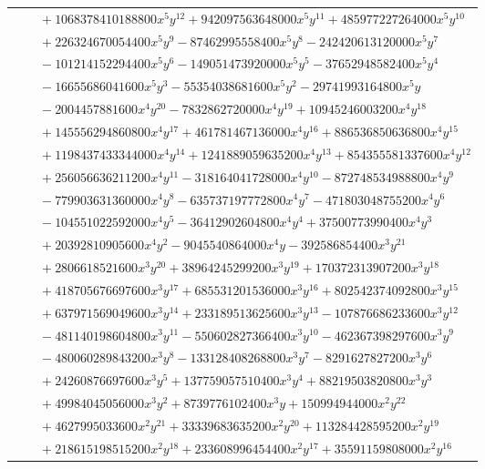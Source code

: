\documentclass[11pt]{article}
\begin{document}
\begin{longtable}{@{}ll@{}}
 & $\quad +1068378410188800x^{5}y^{12}+942097563648000x^{5}y^{11}+485977227264000x^{5}y^{10}$\\
 & $\quad +226324670054400x^{5}y^{9}-87462995558400x^{5}y^{8}-242420613120000x^{5}y^{7}$\\
 & $\quad -101214152294400x^{5}y^{6}-149051473920000x^{5}y^{5}-37652948582400x^{5}y^{4}$\\
 & $\quad -16655686041600x^{5}y^{3}-55354038681600x^{5}y^{2}-29741993164800x^{5}y$\\
 & $\quad -2004457881600x^{4}y^{20}-7832862720000x^{4}y^{19}+10945246003200x^{4}y^{18}$\\
 & $\quad +145556294860800x^{4}y^{17}+461781467136000x^{4}y^{16}+886536850636800x^{4}y^{15}$\\
 & $\quad +1198437433344000x^{4}y^{14}+1241889059635200x^{4}y^{13}+854355581337600x^{4}y^{12}$\\
 & $\quad +256056636211200x^{4}y^{11}-318164041728000x^{4}y^{10}-872748534988800x^{4}y^{9}$\\
 & $\quad -779903631360000x^{4}y^{8}-635737197772800x^{4}y^{7}-471803048755200x^{4}y^{6}$\\
 & $\quad -104551022592000x^{4}y^{5}-36412902604800x^{4}y^{4}+37500773990400x^{4}y^{3}$\\
 & $\quad +20392810905600x^{4}y^{2}-9045540864000x^{4}y-392586854400x^{3}y^{21}$\\
 & $\quad +2806618521600x^{3}y^{20}+38964245299200x^{3}y^{19}+170372313907200x^{3}y^{18}$\\
 & $\quad +418705676697600x^{3}y^{17}+685531201536000x^{3}y^{16}+802542374092800x^{3}y^{15}$\\
 & $\quad +637971569049600x^{3}y^{14}+233189513625600x^{3}y^{13}-107876686233600x^{3}y^{12}$\\
 & $\quad -481140198604800x^{3}y^{11}-550602827366400x^{3}y^{10}-462367398297600x^{3}y^{9}$\\
 & $\quad -480060289843200x^{3}y^{8}-133128408268800x^{3}y^{7}-8291627827200x^{3}y^{6}$\\
 & $\quad +24260876697600x^{3}y^{5}+137759057510400x^{3}y^{4}+88219503820800x^{3}y^{3}$\\
 & $\quad +49984045056000x^{3}y^{2}+8739776102400x^{3}y+150994944000x^{2}y^{22}$\\
 & $\quad +4627995033600x^{2}y^{21}+33339683635200x^{2}y^{20}+113284428595200x^{2}y^{19}$\\
 & $\quad +218615198515200x^{2}y^{18}+233608996454400x^{2}y^{17}+35591159808000x^{2}y^{16}$\\

\end{longtable}
\end{document}
